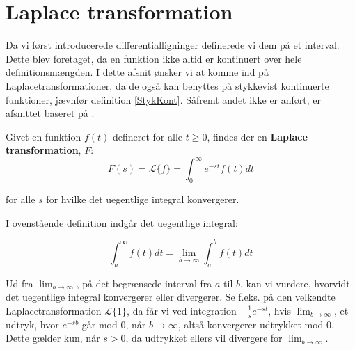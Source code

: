 \section{Laplace transformation}
Da vi først introducerede differentialligninger definerede vi dem på et interval. Dette blev foretaget, da en funktion ikke altid er kontinuert over hele definitionsmængden. I dette afsnit ønsker vi at komme ind på Laplacetransformationer, da de også kan benyttes på stykkevist kontinuerte funktioner, jævnfør definition \ref{StykKont}. Såfremt andet ikke er anført, er afsnittet baseret på \citep[kapitel 4]{EP}.

\begin{definition}
Givet en funktion $f(t)$ defineret for alle $t \geq 0$, findes der en \textbf{Laplace transformation}, $F$:
$$F(s) = \mathcal{L} \{ f\} = \int_{0}^{\infty} e^{-st}f(t)dt $$

for alle $s$ for hvilke det uegentlige integral konvergerer.

\end{definition}

I ovenstående definition indgår det uegentlige integral:

\begin{equation}\label{BToInf}
    \int_a^\infty f(t) dt = \lim_{b\to\infty} \int_a^b f(t) dt
\end{equation}

Ud fra $\lim_{b\to\infty}$, på det begrænsede interval fra $a$ til $b$, kan vi vurdere, hvorvidt det uegentlige integral konvergerer eller divergerer. Se f.eks. på den velkendte Laplacetransformation $\mathcal{L}\{1\}$, da får vi ved integration $-\frac{1}{s}e^{-st}$, hvis $\lim_{b\to\infty}$, et udtryk, hvor $e^{-sb}$ går mod $0$, når $b\to\infty$, altså konvergerer udtrykket mod 0. Dette gælder kun, når $s > 0$, da udtrykket ellers vil divergere for $\lim_{b\to\infty}$.
\hfill \break

